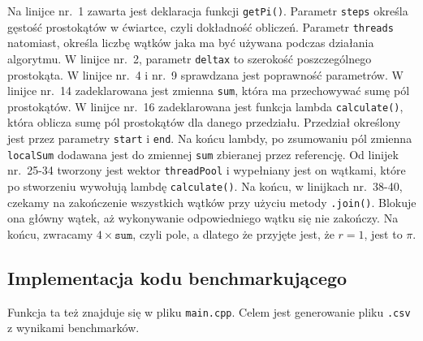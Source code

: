 Na linijce nr.~1 zawarta jest deklaracja funkcji \texttt{getPi()}. Parametr \texttt{steps} określa gęstość prostokątów w ćwiartce, czyli dokładność obliczeń. Parametr \texttt{threads} natomiast, określa liczbę wątków jaka ma być używana podczas działania algorytmu. W linijce nr.~2, parametr \texttt{deltax} to szerokość poszczególnego prostokąta. W linijce nr.~4 i nr.~9 sprawdzana jest poprawność parametrów. W linijce nr.~14 zadeklarowana jest zmienna \texttt{sum}, która ma przechowywać sumę pól prostokątów. W linijce nr.~16 zadeklarowana jest funkcja lambda \texttt{calculate()}, która oblicza sumę pól prostokątów dla danego przedziału. Przedział określony jest przez parametry \texttt{start} i \texttt{end}. Na końcu lambdy, po zsumowaniu pól zmienna \texttt{localSum} dodawana jest do zmiennej \texttt{sum} zbieranej przez referencję. Od linijek nr.~25-34 tworzony jest wektor \texttt{threadPool} i wypełniany jest on wątkami, które po stworzeniu wywołują lambdę \texttt{calculate()}. Na końcu, w linijkach nr.~38-40, czekamy na zakończenie wszystkich wątków przy użyciu metody \texttt{.join()}. Blokuje ona główny wątek, aż wykonywanie odpowiedniego wątku się nie zakończy. Na końcu, zwracamy $4 \times \texttt{sum}$, czyli pole, a dlatego że przyjęte jest, że $r = 1$, jest to $\pi$.

\subsection{Implementacja kodu benchmarkującego} \label{sec:benchmarkimpl}

Funkcja ta też znajduje się w pliku \texttt{main.cpp}. Celem jest generowanie pliku \texttt{.csv} z wynikami benchmarków.

